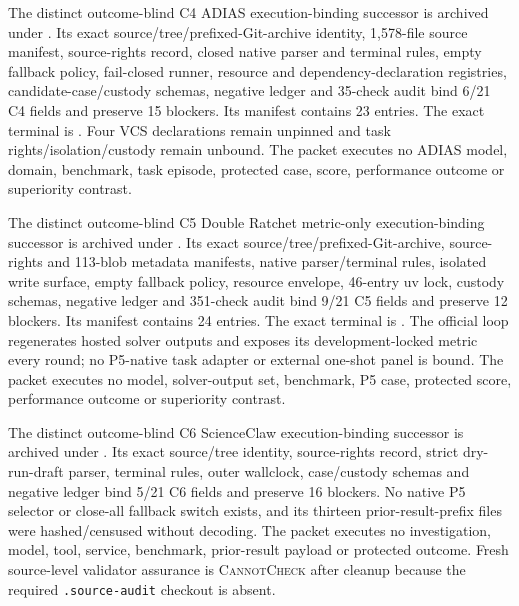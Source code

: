 The distinct outcome-blind C4 ADIAS execution-binding successor is archived
under . Its exact
source/tree/prefixed-Git-archive identity, 1,578-file source manifest,
source-rights record, closed native parser and terminal rules, empty fallback
policy, fail-closed runner, resource and dependency-declaration registries,
candidate-case/custody schemas, negative ledger and 35-check audit bind 6/21 C4
fields and preserve 15 blockers. Its manifest contains 23 entries. The exact
terminal is
.
Four VCS declarations remain unpinned and task rights/isolation/custody remain
unbound. The packet executes no ADIAS model, domain, benchmark, task episode,
protected case, score, performance outcome or superiority contrast.

The distinct outcome-blind C5 Double Ratchet metric-only execution-binding
successor is archived under
. Its exact
source/tree/prefixed-Git-archive, source-rights and 113-blob metadata manifests,
native parser/terminal rules, isolated write surface, empty fallback policy,
resource envelope, 46-entry uv lock, custody schemas, negative ledger and
351-check audit bind 9/21 C5 fields and preserve 12 blockers. Its manifest
contains 24 entries. The exact terminal is
.
The official loop regenerates hosted solver outputs and exposes its
development-locked metric every round; no P5-native task adapter or external
one-shot panel is bound. The packet executes no model, solver-output set,
benchmark, P5 case, protected score, performance outcome or superiority
contrast.

The distinct outcome-blind C6 ScienceClaw execution-binding successor is
archived under
. Its exact
source/tree identity, source-rights record, strict dry-run-draft parser,
terminal rules, outer wallclock, case/custody schemas and negative ledger bind
5/21 C6 fields and preserve 16 blockers. No native P5 selector or close-all
fallback switch exists, and its thirteen prior-result-prefix files were
hashed/censused without decoding. The packet executes no investigation, model,
tool, service, benchmark, prior-result payload or protected outcome. Fresh
source-level validator assurance is \textsc{CannotCheck} after cleanup because
the required \texttt{.source-audit} checkout is absent.

